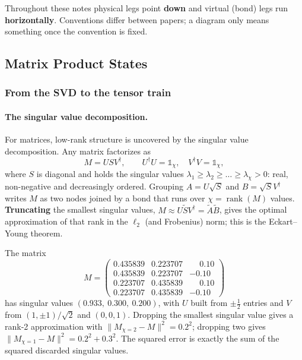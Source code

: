 \begin{notation}
  Throughout these notes physical legs point \textbf{down} and virtual (bond)
  legs run \textbf{horizontally}. Conventions differ between papers; a diagram
  only means something once the convention is fixed.
\end{notation}

\subsection{Matrix Product States}
\label{subsec:mps}

\subsubsection{From the SVD to the tensor train}

\paragraph{The singular value decomposition.}
For matrices, low-rank structure is uncovered by the singular value
decomposition. Any matrix factorizes as
\begin{equation}
  M = U S V^{\dagger}, \qquad U^{\dagger}U = \mathbb{1}_{\chi}, \quad
  V^{\dagger}V = \mathbb{1}_{\chi},
  \label{eq:svd}
\end{equation}%
where $S$ is diagonal and holds the singular values $\lambda_1 \ge \lambda_2
\ge \dots \ge \lambda_{\chi} > 0$: real, non-negative and decreasingly ordered.
Grouping $A = U\sqrt{S}$ and $B = \sqrt{S}V^{\dagger}$ writes $M$ as two nodes
joined by a bond that runs over $\chi = \operatorname{rank}(M)$ values.
\textbf{Truncating} the smallest singular values, $M \approx U\tilde{S}V^{\dagger}
= \tilde{A}\tilde{B}$, gives the optimal approximation of that rank in the
$\ell_2$ (and Frobenius) norm; this is the Eckart--Young theorem.

\begin{example}
  The matrix
  \begin{equation*}
    M = \begin{pmatrix}
      0.435839 & 0.223707 & \phantom{-}0.10\\
      0.435839 & 0.223707 & -0.10\\
      0.223707 & 0.435839 & \phantom{-}0.10\\
      0.223707 & 0.435839 & -0.10
    \end{pmatrix}
  \end{equation*}
  has singular values $(0.933,\ 0.300,\ 0.200)$, with $U$ built from
  $\pm\tfrac12$ entries and $V$ from $(1,\pm1)/\sqrt2$ and $(0,0,1)$. Dropping
  the smallest singular value gives a rank-2 approximation with
  $\|M_{\chi=2} - M\|^2 = 0.2^2$; dropping two gives
  $\|M_{\chi=1}-M\|^2 = 0.2^2 + 0.3^2$. The squared error is exactly the sum of
  the squared discarded singular values.
\end{example}

